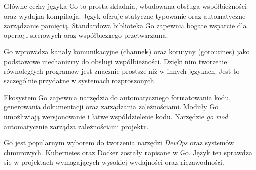 Główne cechy języka Go to prosta składnia, wbudowana obsługa współbieżności oraz wydajna kompilacja.
Język oferuje statyczne typowanie oraz automatyczne zarządzanie pamięcią.
Standardowa biblioteka Go zapewnia bogate wsparcie dla operacji sieciowych oraz współbieżnego przetwarzania.

Go wprowadza kanały komunikacyjne (channels) oraz korutyny (goroutines) jako podstawowe mechanizmy do obsługi współbieżności.
Dzięki nim tworzenie równoległych programów jest znacznie prostsze niż w innych językach.
Jest to szczególnie przydatne w systemach rozproszonych.

Ekosystem Go zapewnia narzędzia do automatycznego formatowania kodu, generowania dokumentacji oraz zarządzania zależnościami.
Moduły Go umożliwiają wersjonowanie i łatwe współdzielenie kodu.
Narzędzie \textit{go mod} automatycznie zarządza zależnościami projektu.

Go jest popularnym wyborem do tworzenia narzędzi \textit{DevOps} oraz systemów chmurowych.
Kubernetes oraz Docker zostały napisane w Go. Język ten sprawdza się w projektach wymagających wysokiej wydajności oraz niezawodności.